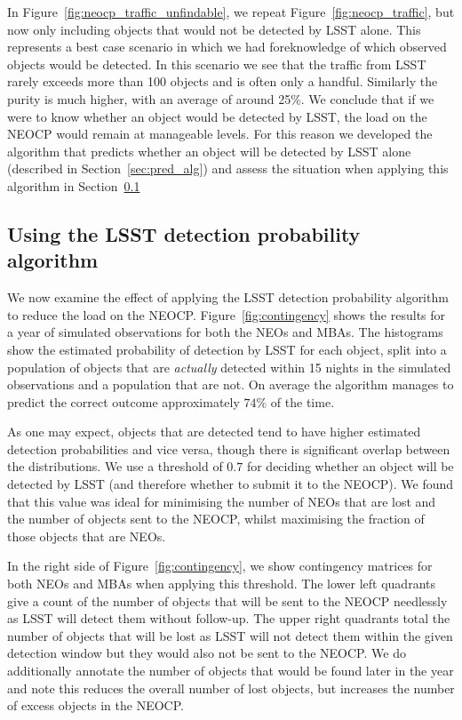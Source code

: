 \documentclass[twocolumn]{aastex631}
\newcommand{\efficiencyAlg}{74}
\newcommand{\thresholdAlg}{0.7}
\begin{document}
In Figure~\ref{fig:neocp_traffic_unfindable}, we repeat Figure~\ref{fig:neocp_traffic}, but now only including objects that would not be detected by LSST alone. This represents a best case scenario in which we had foreknowledge of which observed objects would be detected. In this scenario we see that the traffic from LSST rarely exceeds more than 100 objects and is often only a handful. Similarly the purity is much higher, with an average of around 25\%. We conclude that if we were to know whether an object would be detected by LSST, the load on the NEOCP would remain at manageable levels. For this reason we developed the algorithm that predicts whether an object will be detected by LSST alone (described in Section~\ref{sec:pred_alg}) and assess the situation when applying this algorithm in Section~\ref{sec:using_alg}

\subsection{Using the LSST detection probability algorithm}\label{sec:using_alg}
We now examine the effect of applying the LSST detection probability algorithm to reduce the load on the NEOCP. Figure~\ref{fig:contingency} shows the results for a year of simulated observations for both the NEOs and MBAs. The histograms show the estimated probability of detection by LSST for each object, split into a population of objects that are \textit{actually} detected within 15 nights in the simulated observations and a population that are not. On average the algorithm manages to predict the correct outcome approximately $\efficiencyAlg{}\%$ of the time.

As one may expect, objects that are detected tend to have higher estimated detection probabilities and vice versa, though there is significant overlap between the distributions. We use a threshold of $\thresholdAlg{}$ for deciding whether an object will be detected by LSST (and therefore whether to submit it to the NEOCP). We found that this value was ideal for minimising the number of NEOs that are lost and the number of objects sent to the NEOCP, whilst maximising the fraction of those objects that are NEOs.

In the right side of Figure~\ref{fig:contingency}, we show contingency matrices for both NEOs and MBAs when applying this threshold. The lower left quadrants give a count of the number of objects that will be sent to the NEOCP needlessly as LSST will detect them without follow-up. The upper right quadrants total the number of objects that will be lost as LSST will not detect them within the given detection window but they would also not be sent to the NEOCP. We do additionally annotate the number of objects that would be found later in the year and note this reduces the overall number of lost objects, but increases the number of excess objects in the NEOCP.
\end{document}
